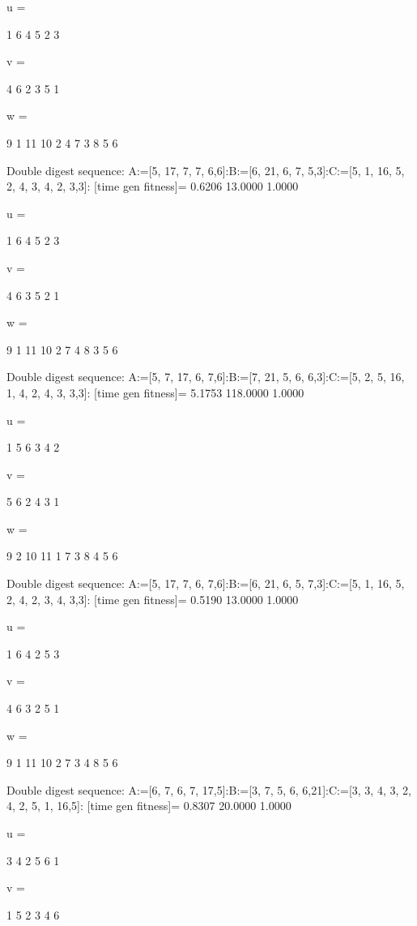 u =

     1     6     4     5     2     3


v =

     4     6     2     3     5     1


w =

     9     1    11    10     2     4     7     3     8     5     6

Double digest sequence:
A:=[5, 17, 7, 7, 6,6]:B:=[6, 21, 6, 7, 5,3]:C:=[5, 1, 16, 5, 2, 4, 3, 4, 2, 3,3]:
[time gen fitness]=
    0.6206   13.0000    1.0000


u =

     1     6     4     5     2     3


v =

     4     6     3     5     2     1


w =

     9     1    11    10     2     7     4     8     3     5     6

Double digest sequence:
A:=[5, 7, 17, 6, 7,6]:B:=[7, 21, 5, 6, 6,3]:C:=[5, 2, 5, 16, 1, 4, 2, 4, 3, 3,3]:
[time gen fitness]=
    5.1753  118.0000    1.0000


u =

     1     5     6     3     4     2


v =

     5     6     2     4     3     1


w =

     9     2    10    11     1     7     3     8     4     5     6

Double digest sequence:
A:=[5, 17, 7, 6, 7,6]:B:=[6, 21, 6, 5, 7,3]:C:=[5, 1, 16, 5, 2, 4, 2, 3, 4, 3,3]:
[time gen fitness]=
    0.5190   13.0000    1.0000


u =

     1     6     4     2     5     3


v =

     4     6     3     2     5     1


w =

     9     1    11    10     2     7     3     4     8     5     6

Double digest sequence:
A:=[6, 7, 6, 7, 17,5]:B:=[3, 7, 5, 6, 6,21]:C:=[3, 3, 4, 3, 2, 4, 2, 5, 1, 16,5]:
[time gen fitness]=
    0.8307   20.0000    1.0000


u =

     3     4     2     5     6     1


v =

     1     5     2     3     4     6


